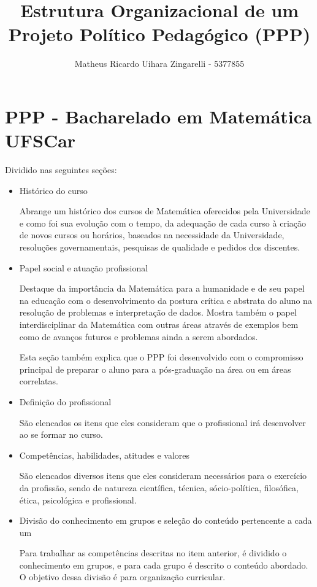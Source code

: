 \documentclass[a4paper]{article}
\author{Matheus Ricardo Uihara Zingarelli - 5377855}
\title{Estrutura Organizacional de um \\Projeto Político Pedagógico (PPP)}
\begin{document}
\maketitle

\section{PPP - Bacharelado em Matemática UFSCar}

Dividido nas seguintes seções:
\begin{itemize}
\item Histórico do curso

Abrange um histórico dos cursos de Matemática oferecidos pela Universidade e como foi sua evolução com o tempo, da adequação de cada curso à criação de novos cursos ou horários, baseados na necessidade da Universidade, resoluções governamentais, pesquisas de qualidade e pedidos dos discentes.

\item Papel social e atuação profissional

Destaque da importância da Matemática para a humanidade e de seu papel na educação com o desenvolvimento da postura crítica e abstrata do aluno na resolução de problemas e interpretação de dados. Mostra também o papel interdisciplinar da Matemática com outras áreas através de exemplos bem como de avanços futuros e problemas ainda a serem abordados.

Esta seção também explica que o PPP foi desenvolvido com o compromisso principal de preparar o aluno para a pós-graduação na área ou em áreas correlatas.

\item Definição do profissional

São elencados os itens que eles consideram que o profissional irá desenvolver ao se formar no curso.

\item Competências, habilidades, atitudes e valores

São elencados diversos itens que eles consideram necessários para o exercício da profissão, sendo de natureza científica, técnica, sócio-política, filosófica, ética, psicológica e profissional.

\item Divisão do conhecimento em grupos e seleção do conteúdo pertencente a cada um

Para trabalhar as competências descritas no item anterior, é dividido o conhecimento em grupos, e para cada grupo é descrito o conteúdo abordado. O objetivo dessa divisão é para organização curricular.


\end{itemize}
\end{document}
